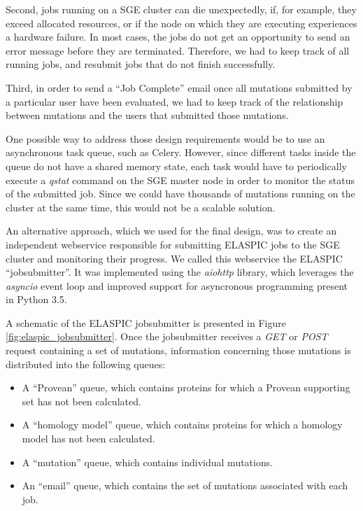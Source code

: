 Second, jobs running on a SGE cluster can die unexpectedly, if, for example, they exceed allocated resources, or if the node on which they are executing experiences a hardware failure. In most cases, the jobs do not get an opportunity to send an error message before they are terminated. Therefore, we had to keep track of all running jobs, and resubmit jobs that do not finish successfully.

Third, in order to send a ``Job Complete'' email once all mutations submitted by a particular user have been evaluated, we had to keep track of the relationship between mutations and the users that submitted those mutations.

One possible way to address those design requirements would be to use an asynchronous task queue, such as Celery. However, since different tasks inside the queue do not have a shared memory state, each task would have to periodically execute a \textit{qstat} command on the SGE master node in order to monitor the status of the submitted job. Since we could have thousands of mutations running on the cluster at the same time, this would not be a scalable solution.

An alternative approach, which we used for the final design, was to create an independent webservice responsible for submitting ELASPIC jobs to the SGE cluster and monitoring their progress. We called this webservice the ELASPIC ``jobsubmitter''. It was implemented using the \textit{aiohttp} library, which leverages the \textit{asyncio} event loop and improved support for asyncronous programming present in Python 3.5.

A schematic of the ELASPIC jobsubmitter is presented in Figure \ref{fig:elaspic_jobsubmitter}. Once the jobsubmitter receives a \textit{GET} or \textit{POST} request containing a set of mutations, information concerning those mutations is distributed into the following queues:

\begin{itemize}
	\itemsep0em
	\item A ``Provean'' queue, which contains proteins for which a Provean supporting set has not been calculated.
	\item A ``homology model'' queue, which contains proteins for which a homology model has not been calculated.
	\item A ``mutation'' queue, which contains individual mutations.
	\item An ``email'' queue, which contains the set of mutations associated with each job.
\end{itemize}

